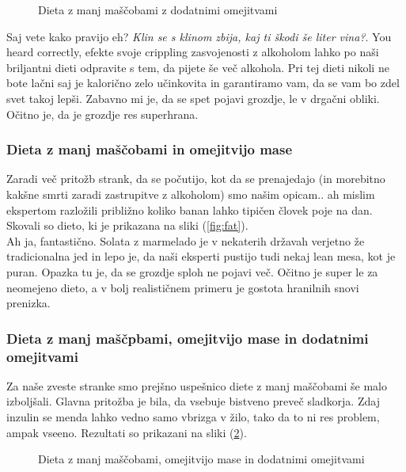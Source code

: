 \documentclass[a4paper]{article}
\begin{document}
\begin{figure}[H]
    \centering
    \caption{Dieta z manj maščobami z dodatnimi omejitvami}
    \label{fig:fat-add-no-mass}
\end{figure}

Saj vete kako pravijo eh? \textit{Klin se s klinom zbija, kaj ti škodi še liter vina?}. You heard 
correctly, efekte svoje crippling zasvojenosti z alkoholom lahko po naši briljantni dieti odpravite
s tem, da pijete še več alkohola. Pri tej dieti nikoli ne bote lačni saj je kalorično zelo učinkovita 
in garantiramo vam, da se vam bo zdel svet takoj lepši. Zabavno mi je, da se spet pojavi grozdje, le 
v drgačni obliki. Očitno je, da je grozdje res superhrana.\\

\subsubsection{Dieta z manj maščobami in omejitvijo mase}
Zaradi več pritožb strank, da se počutijo, kot da se prenajedajo (in morebitno kakšne smrti zaradi
zastrupitve z alkoholom) smo našim opicam.. ah mislim ekspertom razložili približno koliko banan lahko
tipičen človek poje na dan. Skovali so dieto, ki je prikazana na sliki (\ref{fig:fat}). \\



Ah ja, fantastično. Solata z marmelado je v nekaterih državah verjetno že tradicionalna jed in lepo je, 
da naši eksperti pustijo tudi nekaj lean mesa, kot je puran. Opazka tu je, da se grozdje sploh ne pojavi več.
Očitno je super le za neomejeno dieto, a v bolj realističnem primeru je gostota hranilnih snovi prenizka. \\

\subsubsection{Dieta z manj maščpbami, omejitvijo mase in dodatnimi omejitvami}
Za naše zveste stranke smo prejšno uspešnico diete z manj maščobami še malo izboljšali. Glavna pritožba
je bila, da vsebuje bistveno preveč sladkorja. Zdaj inzulin se menda lahko vedno samo vbrizga v žilo,
tako da to ni res problem, ampak vseeno. Rezultati so prikazani na sliki (\ref{fig:fat-add}). \\

\begin{figure}[H]
    \centering
    \caption{Dieta z manj maščobami, omejitvijo mase in dodatnimi omejitvami}
    \label{fig:fat-add}
\end{figure}
\end{document}
